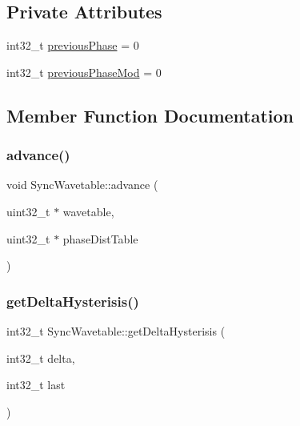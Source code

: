 \subsection*{Private Attributes}
\begin{DoxyCompactItemize}
\item 
int32\+\_\+t \mbox{\hyperlink{class_sync_wavetable_a60617a7ffd047ab09c259eadb30cbac9}{previous\+Phase}} = 0
\item 
int32\+\_\+t \mbox{\hyperlink{class_sync_wavetable_a090e7c425650ac3cba86468227e41910}{previous\+Phase\+Mod}} = 0
\end{DoxyCompactItemize}


\subsection{Member Function Documentation}
\mbox{\label{class_sync_wavetable_acd0675d2c450cab445402407751a8d0e}} 
\subsubsection{\texorpdfstring{advance()}{advance()}}
{\footnotesize\ttfamily void Sync\+Wavetable\+::advance (\begin{DoxyParamCaption}\item[{uint32\+\_\+t $\ast$}]{wavetable,  }\item[{uint32\+\_\+t $\ast$}]{phase\+Dist\+Table }\end{DoxyParamCaption})\hspace{0.3cm}{\ttfamily [inline]}}

\mbox{\label{class_sync_wavetable_aa8167f7716afc76e70766a76077240b7}} 
\subsubsection{\texorpdfstring{get\+Delta\+Hysterisis()}{getDeltaHysterisis()}}
{\footnotesize\ttfamily int32\+\_\+t Sync\+Wavetable\+::get\+Delta\+Hysterisis (\begin{DoxyParamCaption}\item[{int32\+\_\+t}]{delta,  }\item[{int32\+\_\+t}]{last }\end{DoxyParamCaption})\hspace{0.3cm}{\ttfamily [inline]}}

